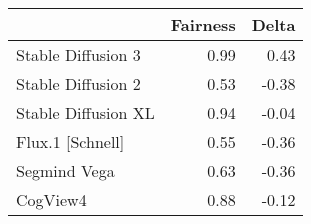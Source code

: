 \begin{tabular}{lrr}
\toprule
 & Fairness & Delta \\
\midrule
Stable Diffusion 3 & 0.99 & 0.43 \\
Stable Diffusion 2 & 0.53 & -0.38 \\
Stable Diffusion XL & 0.94 & -0.04 \\
Flux.1 [Schnell] & 0.55 & -0.36 \\
Segmind Vega & 0.63 & -0.36 \\
CogView4 & 0.88 & -0.12 \\
\bottomrule
\end{tabular}
